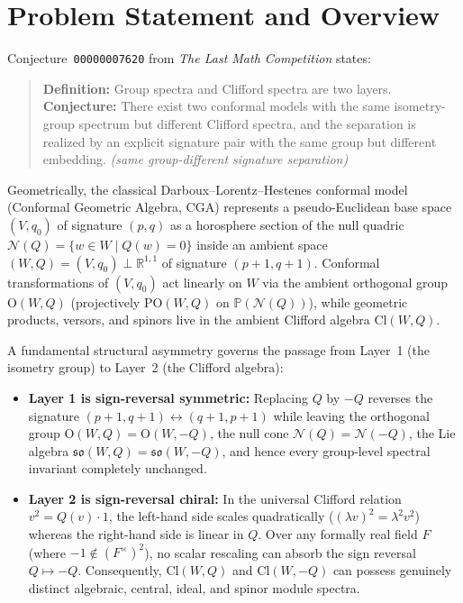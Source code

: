 \documentclass[11pt]{article}
\theoremstyle{definition}
\newcommand{\Cl}{\mathrm{Cl}}
\newcommand{\Orth}{\mathrm{O}}
\newcommand{\POrth}{\mathrm{PO}}
\newcommand{\so}{\mathfrak{so}}
\begin{document}
\section{Problem Statement and Overview}

Conjecture~\texttt{00000007620} from \emph{The Last Math Competition} states:

\begin{quote}
\textbf{Definition:} Group spectra and Clifford spectra are two layers.\\
\textbf{Conjecture:} There exist two conformal models with the same isometry-group spectrum but different Clifford spectra, and the separation is realized by an explicit signature pair with the same group but different embedding. \emph{(same group-different signature separation)}
\end{quote}

Geometrically, the classical Darboux--Lorentz--Hestenes conformal model (Conformal Geometric Algebra, CGA) represents a pseudo-Euclidean base space $(V, q_0)$ of signature $(p, q)$ as a horosphere section of the null quadric $\mathcal{N}(Q) = \{w \in W \mid Q(w) = 0\}$ inside an ambient space $(W, Q) = (V, q_0) \perp \mathbb{R}^{1,1}$ of signature $(p + 1, q + 1)$. Conformal transformations of $(V, q_0)$ act linearly on $W$ via the ambient orthogonal group $\Orth(W, Q)$ (projectively $\POrth(W, Q)$ on $\mathbb{P}(\mathcal{N}(Q))$), while geometric products, versors, and spinors live in the ambient Clifford algebra $\Cl(W, Q)$.

A fundamental structural asymmetry governs the passage from Layer~1 (the isometry group) to Layer~2 (the Clifford algebra):
\begin{itemize}
  \item \textbf{Layer 1 is sign-reversal symmetric:} Replacing $Q$ by $-Q$ reverses the signature $(p+1, q+1) \leftrightarrow (q+1, p+1)$ while leaving the orthogonal group $\Orth(W, Q) = \Orth(W, -Q)$, the null cone $\mathcal{N}(Q) = \mathcal{N}(-Q)$, the Lie algebra $\so(W, Q) = \so(W, -Q)$, and hence every group-level spectral invariant completely unchanged.
  \item \textbf{Layer 2 is sign-reversal chiral:} In the universal Clifford relation $v^2 = Q(v)\cdot 1$, the left-hand side scales quadratically ($(\lambda v)^2 = \lambda^2 v^2$) whereas the right-hand side is linear in $Q$. Over any formally real field $F$ (where $-1 \notin (F^\times)^2$), no scalar rescaling can absorb the sign reversal $Q \mapsto -Q$. Consequently, $\Cl(W, Q)$ and $\Cl(W, -Q)$ can possess genuinely distinct algebraic, central, ideal, and spinor module spectra.
\end{itemize}
\end{document}
